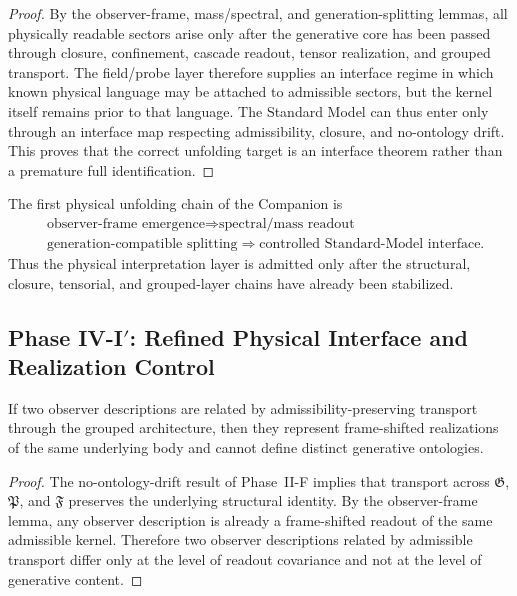 \begin{proof}
By the observer-frame, mass/spectral, and generation-splitting lemmas, all physically readable sectors arise only after the generative core has been passed through closure, confinement, cascade readout, tensor realization, and grouped transport. The field/probe layer therefore supplies an interface regime in which known physical language may be attached to admissible sectors, but the kernel itself remains prior to that language. The Standard Model can thus enter only through an interface map respecting admissibility, closure, and no-ontology drift. This proves that the correct unfolding target is an interface theorem rather than a premature full identification.
\end{proof}

\begin{corollary}
\label{cor:first-physical-unfolding-chain}
The first physical unfolding chain of the Companion is
\[
\begin{aligned}
&\text{observer-frame emergence}
 \Longrightarrow \text{spectral/mass readout}\\
&\text{generation-compatible splitting}
 \Longrightarrow \text{controlled Standard-Model interface}.
\end{aligned}
\]
Thus the physical interpretation layer is admitted only after the structural, closure, tensorial, and grouped-layer chains have already been stabilized.
\end{corollary}


\subsection*{Phase IV-I$'$: Refined Physical Interface and Realization Control}

\begin{lemma}
\label{lem:observer-covariance-admissible-transport}
If two observer descriptions are related by admissibility-preserving transport through the grouped architecture, then they represent frame-shifted realizations of the same underlying body and cannot define distinct generative ontologies.
\end{lemma}

\begin{proof}
The no-ontology-drift result of Phase~II-F implies that transport across $\mathfrak G$, $\mathfrak P$, and $\mathfrak F$ preserves the underlying structural identity. By the observer-frame lemma, any observer description is already a frame-shifted readout of the same admissible kernel. Therefore two observer descriptions related by admissible transport differ only at the level of readout covariance and not at the level of generative content.
\end{proof}

